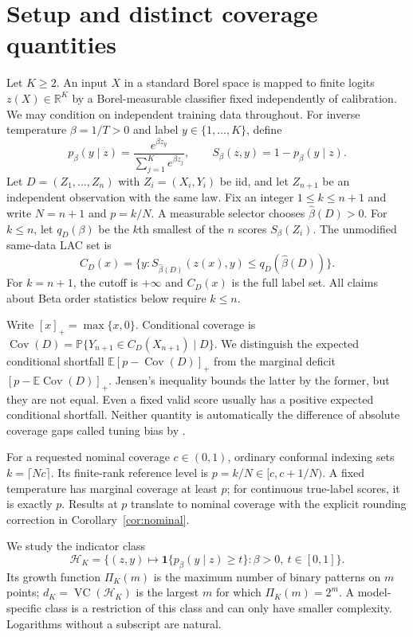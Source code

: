 \documentclass[10pt]{article}
\theoremstyle{definition}\newtheorem{definition}[theorem]{Definition}
\theoremstyle{remark}\newtheorem{remark}[theorem]{Remark}
\newcommand{\R}{\mathbb R}
\newcommand{\E}{\mathbb E}
\newcommand{\Prob}{\mathbb P}
\newcommand{\1}{\mathbf 1}
\newcommand{\HH}{\mathcal H}
\newcommand{\VC}{\operatorname{VC}}
\newcommand{\Cov}{\operatorname{Cov}}
\newcommand{\pos}[1]{\left[#1\right]_+}
\begin{document}
\section{Setup and distinct coverage quantities}\label{sec:setup}
Let $K\ge2$. An input $X$ in a standard Borel space is mapped to finite logits $z(X)\in\R^K$ by a Borel-measurable classifier fixed independently of calibration. We may condition on independent training data throughout. For inverse temperature $\beta=1/T>0$ and label $y\in\{1,\ldots,K\}$, define
\begin{equation}\label{eq:softmax}
 p_\beta(y\mid z)=\frac{e^{\beta z_y}}{\sum_{j=1}^K e^{\beta z_j}},
 \qquad S_\beta(z,y)=1-p_\beta(y\mid z).
\end{equation}
Let $D=(Z_1,\ldots,Z_n)$ with $Z_i=(X_i,Y_i)$ be iid, and let $Z_{n+1}$ be an independent observation with the same law. Fix an integer $1\le k\le n+1$ and write $N=n+1$ and $p=k/N$. A measurable selector chooses $\widehat\beta(D)>0$. For $k\le n$, let $q_D(\beta)$ be the $k$th smallest of the $n$ scores $S_\beta(Z_i)$. The unmodified same-data LAC set is
\begin{equation}\label{eq:set}
 C_D(x)=\{y:S_{\widehat\beta(D)}(z(x),y)\le q_D(\widehat\beta(D))\}.
\end{equation}
For $k=n+1$, the cutoff is $+\infty$ and $C_D(x)$ is the full label set. All claims about Beta order statistics below require $k\le n$.

Write $[x]_+=\max\{x,0\}$. Conditional coverage is $\Cov(D)=\Prob\{Y_{n+1}\in C_D(X_{n+1})\mid D\}$. We distinguish the expected conditional shortfall $\E\pos{p-\Cov(D)}$ from the marginal deficit $\pos{p-\E\Cov(D)}$. Jensen's inequality bounds the latter by the former, but they are not equal. Even a fixed valid score usually has a positive expected conditional shortfall. Neither quantity is automatically the difference of absolute coverage gaps called tuning bias by \citet{zeng2025}.

For a requested nominal coverage $c\in(0,1)$, ordinary conformal indexing sets $k=\lceil Nc\rceil$. Its finite-rank reference level is $p=k/N\in[c,c+1/N)$. A fixed temperature has marginal coverage at least $p$; for continuous true-label scores, it is exactly $p$. Results at $p$ translate to nominal coverage with the explicit rounding correction in Corollary~\ref{cor:nominal}.

We study the indicator class
\begin{equation}\label{eq:class}
 \HH_K=\bigl\{(z,y)\mapsto\1\{p_\beta(y\mid z)\ge t\}:\beta>0,\ t\in[0,1]\bigr\}.
\end{equation}
Its growth function $\Pi_K(m)$ is the maximum number of binary patterns on $m$ points; $d_K=\VC(\HH_K)$ is the largest $m$ for which $\Pi_K(m)=2^m$. A model-specific class is a restriction of this class and can only have smaller complexity. Logarithms without a subscript are natural.
\end{document}
